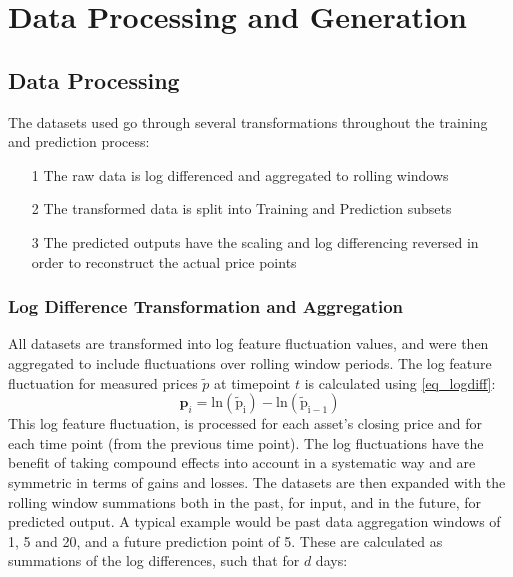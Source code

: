 \documentclass[a4paper,11pt,oneside]{article}
\theoremstyle{plain}
\theoremstyle{definition}
\begin{document}
\newpage


\section{Data Processing and Generation }\label{Data}
\subsection{Data Processing}\label{data_processing}

The datasets used go through several transformations throughout the training and prediction process:

\begin{itemize}
	\item [1] The raw data is log differenced and aggregated to rolling windows
	\item [2] The transformed data is split into Training and Prediction subsets
	\item [3] The predicted outputs have the scaling and log differencing reversed in order to reconstruct the actual price points
\end{itemize}

\subsubsection{Log Difference Transformation and Aggregation}\label{ldata_og_difference}
All datasets are transformed into log feature fluctuation values, and were then aggregated to include fluctuations over rolling window periods. The log feature fluctuation for measured prices $\tilde{p}$ at timepoint $t$ is calculated using \eqref{eq_logdiff}:
\begin{equation}\label{eq_logdiff}
\mathbf{p}_i = \mathrm{ln(\tilde{p}_i) - \mathrm{ln}(\tilde{p}_{i-1})}
\end{equation}
This log feature fluctuation,  is processed for each asset's closing price and for each time point (from the previous time point). The log fluctuations have the benefit of taking compound effects into account in a systematic way and are symmetric in terms of gains and losses.
\newline\newline
The datasets are then expanded with the rolling window summations both in the past, for input, and in the future, for predicted output. A typical example would be past data aggregation windows of 1, 5 and 20, and a future prediction point of 5. These are calculated as summations of the log differences, such that for $d$ days:
\end{document}
